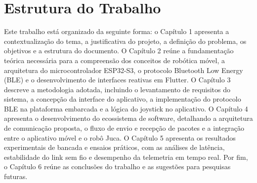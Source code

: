 \section{Estrutura do Trabalho}

Este trabalho está organizado da seguinte forma: o Capítulo 1 apresenta a contextualização do tema, a justificativa do projeto, a definição do problema, os objetivos e a estrutura do documento. O Capítulo 2 reúne a fundamentação teórica necessária para a compreensão dos conceitos de robótica móvel, a arquitetura do microcontrolador ESP32-S3, o protocolo Bluetooth Low Energy (BLE) e o desenvolvimento de interfaces reativas em Flutter. O Capítulo 3 descreve a metodologia adotada, incluindo o levantamento de requisitos do sistema, a concepção da interface do aplicativo, a implementação do protocolo BLE na plataforma embarcada e a lógica do joystick no aplicativo. O Capítulo 4 apresenta o desenvolvimento do ecossistema de software, detalhando a arquitetura de comunicação proposta, o fluxo de envio e recepção de pacotes e a integração entre o aplicativo móvel e o robô Juca. O Capítulo 5 apresenta os resultados experimentais de bancada e ensaios práticos, com as análises de latência, estabilidade do link sem fio e desempenho da telemetria em tempo real. Por fim, o Capítulo 6 reúne as conclusões do trabalho e as sugestões para pesquisas futuras.
